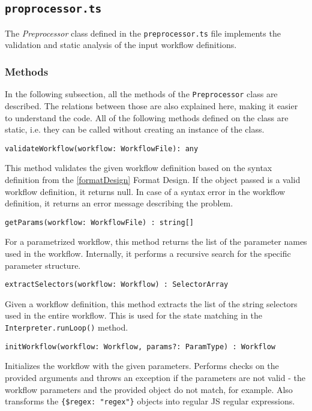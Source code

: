 \subsection{\texttt{proprocessor.ts}}

The \textit{Preprocessor} class defined in the \texttt{preprocessor.ts} file implements the validation and static analysis of the input workflow definitions.

\subsubsection{Methods}

In the following subsection, all the methods of the \texttt{Preprocessor} class are described.
The relations between those are also explained here, making it easier to understand the code.
All of the following methods defined on the class are static, i.e. they can be called without creating an instance of the class.

\emptyline
\verb|validateWorkflow(workflow: WorkflowFile): any|

\smallskip

This method validates the given workflow definition based on the syntax definition from the \autoref{formatDesign} Format Design. 
If the object passed is a valid workflow definition, it returns null.
In case of a syntax error in the workflow definition, it returns an error message describing the problem.

\emptyline
\verb|getParams(workflow: WorkflowFile) : string[]|

\smallskip

For a parametrized workflow, this method returns the list of the parameter names used in the workflow.
Internally, it performs a recursive search for the specific parameter structure.

\emptyline
\verb|extractSelectors(workflow: Workflow) : SelectorArray|

\smallskip

Given a workflow definition, this method extracts the list of the string selectors used in the entire workflow.
This is used for the state matching in the \texttt{Interpreter.runLoop()} method.

\emptyline
\verb|initWorkflow(workflow: Workflow, params?: ParamType) : Workflow|

\smallskip

Initializes the workflow with the given parameters. 
Performs checks on the provided arguments and throws an exception if the parameters are not valid
- the workflow parameters and the provided object do not match, for example.
Also transforms the \verb|{$regex: "regex"}| objects into regular \acs{JS} regular expressions.